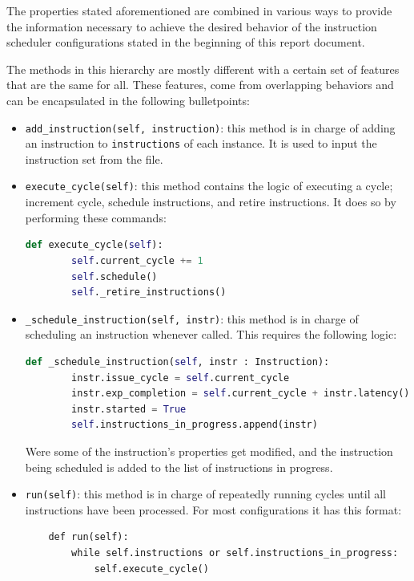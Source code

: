 \documentclass{article}
\begin{document}
The properties stated aforementioned are combined in various ways to provide the information necessary to achieve the desired behavior of the instruction scheduler configurations stated in the beginning of this report document.

The methods in this hierarchy are mostly different with a certain set of features that are the same for all. These features, come from overlapping behaviors and can be encapsulated in the following bulletpoints:

\begin{itemize}
    \item \lstinline{add_instruction(self, instruction)}: this method is in charge of adding an instruction to \lstinline|instructions| of each instance. It is used to input the instruction set from the file.
    \item \lstinline{execute_cycle(self)}: this method contains the logic of executing a cycle; increment cycle, schedule instructions, and retire instructions. It does so by performing these commands:
    \begin{lstlisting}[language=Python]
    def execute_cycle(self):
        self.current_cycle += 1
        self.schedule()
        self._retire_instructions()
    \end{lstlisting}
    \item \lstinline|_schedule_instruction(self, instr)|: this method is in charge of scheduling an instruction whenever called. This requires the following logic: 
    \begin{lstlisting}[language=Python]
    def _schedule_instruction(self, instr : Instruction):
        instr.issue_cycle = self.current_cycle
        instr.exp_completion = self.current_cycle + instr.latency()
        instr.started = True 
        self.instructions_in_progress.append(instr)
    \end{lstlisting}
    Were some of the instruction's properties get modified, and the instruction being scheduled is added to the list of instructions in progress. 
    \item \lstinline|run(self)|: this method is in charge of repeatedly running cycles until all instructions have been processed. For most configurations it has this format:
    \begin{lstlisting}
    def run(self):
        while self.instructions or self.instructions_in_progress:
            self.execute_cycle()
    \end{lstlisting}
\end{itemize}
\end{document}

